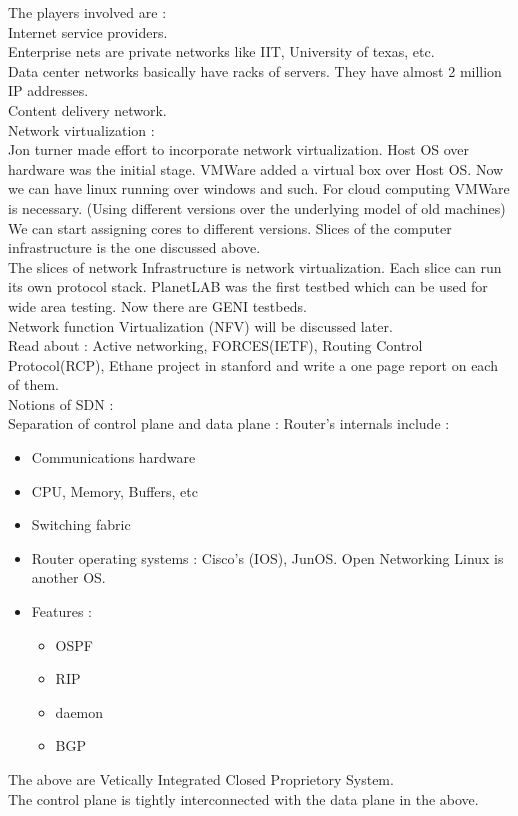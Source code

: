 \documentclass[solution,addpoints,12pt]{exam}
\begin{document}
The players involved are :\\
Internet service providers.\\
Enterprise nets are private networks like IIT, University of texas, etc.\\
Data center networks basically have racks of servers. They have almost
2 million IP addresses.\\
Content delivery network.\\

Network virtualization :\\
Jon turner made effort to incorporate network virtualization.
Host OS over hardware was the initial stage. VMWare
added a virtual box over Host OS. Now we can have linux running
over windows and such. For cloud computing VMWare is necessary.
(Using different versions over the underlying model of old machines)\\
We can start assigning cores to different versions. Slices
of the computer infrastructure is the one discussed above.\\

The slices of network Infrastructure is network virtualization.
Each slice can run its own protocol stack. PlanetLAB was the
first testbed which can be used for wide area testing.
Now there are GENI testbeds.\\

Network function Virtualization (NFV) will be discussed later.\\

Read about : Active networking, FORCES(IETF), Routing Control Protocol(RCP),
Ethane project in stanford and write a one page report on each of them.\\

Notions of SDN :\\
Separation of control plane and data plane :
Router's internals include :\\
\begin{itemize}
\item Communications hardware
\item CPU, Memory, Buffers, etc
\item Switching fabric
\item Router operating systems : Cisco's (IOS), JunOS.
Open Networking Linux is another OS.
\item Features :
\begin{itemize}
\item OSPF
\item RIP
\item daemon
\item BGP
\end{itemize}
\end{itemize}
The above are Vetically Integrated Closed Proprietory System.\\
The control plane is tightly interconnected with the data
plane in the above.\\
\end{document}
